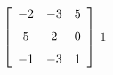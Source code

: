 {$\left[ \begin {array}{ccc} -2&-3&5\\\noalign{\medskip}5&2&0
\\\noalign{\medskip}-1&-3&1\end {array} \right] $} 
{$1$}



  

